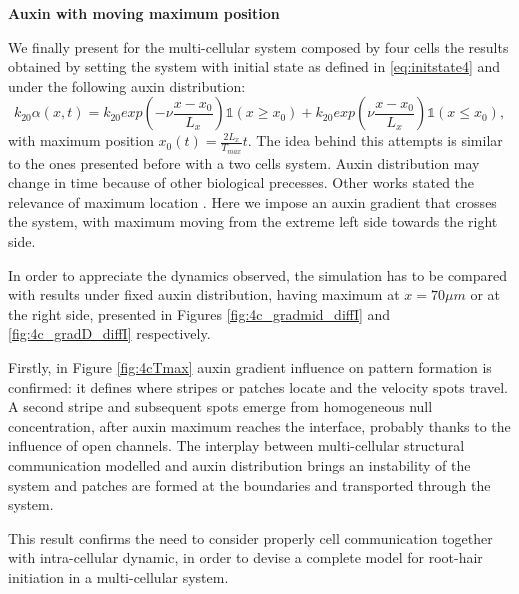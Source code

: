 \textbf{Auxin with moving maximum position}

We finally present for the multi-cellular system composed by four cells the results obtained by setting the system with initial state as defined in \eqref{eq:initstate4} and under the following auxin distribution:
\begin{equation*}
  k_{20} \alpha(x,t) = k_{20} exp\left(-\nu\frac{x-x_0}{L_x}\right)  \mathbb{1}(x\geq x_0) + k_{20} exp\left(\nu \frac{x-x_0}{L_x}\right) \mathbb{1}(x\leq x_0),
\end{equation*}
with maximum position $x_0(t) = \frac{2 L_x}{T_{max}} t$. The idea behind this attempts is similar to the ones presented before with a two cells system. Auxin distribution may change in time because of other biological precesses. Other works stated the relevance of maximum location \cite{article:Veronica}. Here we impose an auxin gradient that crosses the system, with maximum moving from the extreme left side towards the right side.

In order to appreciate the dynamics observed, the simulation has to be compared with results under fixed auxin distribution, having maximum at $x = 70 \mu m$ or at the right side, presented in Figures \ref{fig:4c_gradmid_diffI} and \ref{fig:4c_gradD_diffI} respectively.

Firstly, in Figure \ref{fig:4cTmax} auxin gradient influence on pattern formation is confirmed: it defines where stripes or patches locate and the velocity spots travel. A second stripe and subsequent spots emerge from homogeneous null concentration, after auxin maximum reaches the interface, probably thanks to the influence of open channels. The interplay between multi-cellular structural communication modelled and auxin distribution brings an instability of the system and patches are formed at the boundaries and transported through the system.

This result confirms the need to consider properly cell communication together with intra-cellular dynamic, in order to devise a complete model for root-hair initiation in a multi-cellular system.

